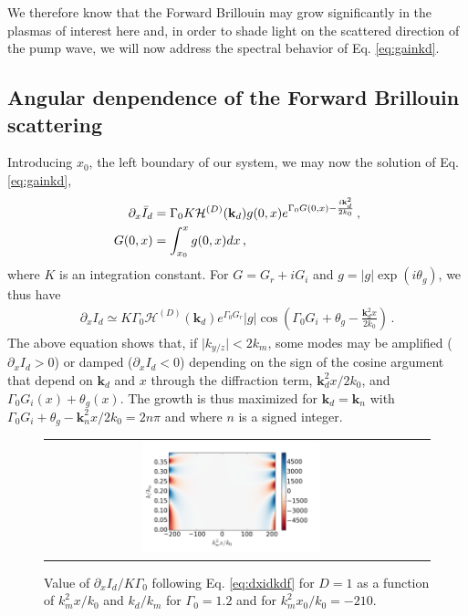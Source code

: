 \documentclass[
 reprint,
 amsmath,amssymb,
 aps,
]{revtex4-1}
\begin{document}
We therefore know that the Forward Brillouin may grow significantly in the plasmas  of interest here and, in order to shade light on the scattered  direction of the pump wave, we will now address the spectral behavior of Eq. \eqref{eq:gainkd}.

\subsection{Angular denpendence of the  Forward Brillouin scattering}

Introducing $x_0$, the left boundary of our system, we may now the solution of Eq. \eqref{eq:gainkd}, 
\begin{align}
\partial_x\Bar{I}_d &=\Gamma_0 K  \mathcal{H}^{(D)}(\mathbf{k}_d) g(0,x)
e^{\Gamma_0 G(0,x)-\frac{i\mathbf{k}_d^2 }{2k_0}} \, ,\nonumber\\
G(0,x)&=\int_{x_0}^{x}g(0,x) dx \, , \label{eq:dxidkd}
\end{align}
where $K$ is an integration constant. 
For $G=G_r+iG_i$ and $g=\vert g \vert \exp(i\theta_g)$, we thus have
\begin{align}
\partial_x I_d \simeq K\Gamma_0 \mathcal{H}^{(D)}(\mathbf{k}_d)  e^{\Gamma_0 G_r} \vert g \vert \cos\left( \Gamma_0 G_i +\theta_g-\frac{\mathbf{k}_d^2 x }{2k_0} \right) \, . \label{eq:dxidkdf}
\end{align} 
The above equation shows that, if $\vert k_{y/z}\vert <2k_m$, some modes may be amplified ($\partial_x I_d>0$) or damped ($\partial_x I_d<0$) depending on the sign of the cosine argument that depend on $\mathbf{k}_d$ and $x$ through the diffraction term, $\mathbf{k}_d^2 x/2k_0$, and $\Gamma_0 G_i(x)+ \theta_g(x)$. 
The growth is thus maximized for $\mathbf{k}_d=\mathbf{k}_n$ with $\Gamma_0 G_i+ \theta_g-\mathbf{k}_n^2 x /2k_0 = 2n\pi$ and where $n$ is a signed integer.
\begin{figure}
\begin{tabular}{cc}
\includegraphics[width=0.49\textwidth]{gkx_2d_2mm.png}
\end{tabular}
\caption{ \label{fig:gxk}
Value of $\partial_x I_d /K\Gamma_0$ following Eq. \eqref{eq:dxidkdf} for $D=1$ as a function of $k_m^2x/k_0$ and $k_d/k_m$ for $\Gamma_0=1.2$ and for   $k_m^2x_0/k_0 = -210$. 
 }
\end{figure}
\end{document}
